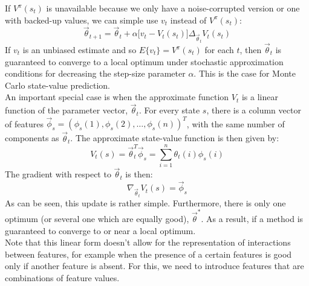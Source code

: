 \documentclass[a4paper]{article}
\begin{document}
If $V^{\pi}(s_t)$ is unavailable because we only have a noise-corrupted version or one with backed-up values, we can simple use $v_t$ instead of $V^{\pi}(s_t)$:
\begin{equation}
\overrightarrow{\theta}_{t+1} = \overrightarrow{\theta}_t + \alpha \big[ v_t - V_t(s_t) \big] \Delta_{\overrightarrow{\theta}_t} V_t(s_t)
\end{equation}
If $v_t$ is an unbiased estimate and so $E\{v_t\} = V^{\pi}(s_t)$ for each $t$, then $\overrightarrow{\theta}_t$ is guaranteed to converge to a local optimum under stochastic approximation conditions for decreasing the step-size parameter $\alpha$. This is the case for Monte Carlo state-value prediction.\\

An important special case is when the approximate function $V_t$ is a linear function of the parameter vector, $\overrightarrow{\theta}_t$. For every state $s$, there is a column vector of features $\overrightarrow{\phi}_s = (\phi_s(1), \phi_s(2), \dots, \phi_s(n))^T$, with the same number of components as $\overrightarrow{\theta}_t$. The approximate state-value function is then given by:
\begin{equation}
V_t(s) = \overrightarrow{\theta}_t^T \overrightarrow{\phi}_s = \sum_{i=1}^n \theta_t(i) \phi_s(i)
\end{equation}
The gradient with respect to $\overrightarrow{\theta}_t$ is then:
\begin{equation}
\nabla_{\overrightarrow{\theta}_t} V_t(s) = \overrightarrow{\phi}_s
\end{equation}
As can be seen, this update is rather simple. Furthermore, there is only one optimum (or several one which are equally good), $\overrightarrow{\theta}^{*}$. As a result, if a method is guaranteed to converge to or near a local optimum.\\
Note that this linear form doesn't allow for the representation of interactions between features, for example when the presence of a certain features is good only if another feature is absent. For this, we need to introduce features that are combinations of feature values.\\
\end{document}
